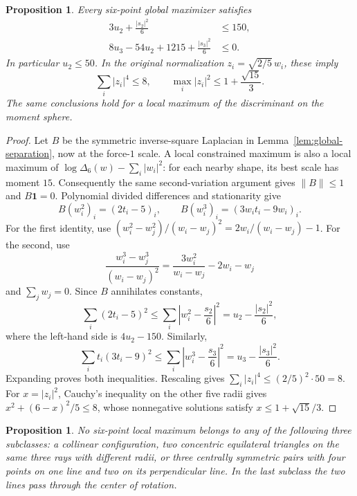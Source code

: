 \documentclass[11pt]{article}
\newtheorem{proposition}[theorem]{Proposition}
\theoremstyle{remark}
\numberwithin{equation}{section}
\begin{document}
\begin{proposition}\label{prop:six-radial-stability}
Every six-point global maximizer satisfies
\begin{align}
 3u_2+\frac{|s_2|^2}{6}&\le150,\label{eq:six-fourth-cut}\\
 8u_3-54u_2+1215+\frac{|s_3|^2}{6}&\le0.
 \label{eq:six-sixth-cut}
\end{align}
In particular $u_2\le50$.  In the original normalization
$z_i=\sqrt{2/5}\,w_i$, these imply
\[
 \sum_i|z_i|^4\le8,\qquad
 \max_i|z_i|^2\le1+\frac{\sqrt{15}}3.
\]
The same conclusions hold for a local maximum of the discriminant
on the moment sphere.
\end{proposition}

\begin{proof}
Let $B$ be the symmetric inverse-square Laplacian in
Lemma~\ref{lem:global-separation}, now at the force-$1$ scale.
A local constrained maximum is also a local maximum of
$\log\Delta_6(w)-\sum_i|w_i|^2$: for each nearby shape, its best
scale has moment $15$.  Consequently the same second-variation
argument gives $\|B\|\le1$ and $B\mathbf1=0$.
Polynomial divided differences and stationarity give
\[
 B(w_i^2)_i=(2t_i-5)_i,
 \qquad
 B(w_i^3)_i=(3w_it_i-9w_i)_i.
\]
For the first identity, use
$(w_i^2-w_j^2)/(w_i-w_j)^2=2w_i/(w_i-w_j)-1$.
For the second, use
\[
 \frac{w_i^3-w_j^3}{(w_i-w_j)^2}
 =\frac{3w_i^2}{w_i-w_j}-2w_i-w_j
\]
and $\sum_jw_j=0$.
Since $B$ annihilates constants,
\[
 \sum_i(2t_i-5)^2
 \le\sum_i\left|w_i^2-\frac{s_2}{6}\right|^2
 =u_2-\frac{|s_2|^2}{6},
\]
where the left-hand side is $4u_2-150$.
Similarly,
\[
 \sum_it_i(3t_i-9)^2
 \le\sum_i\left|w_i^3-\frac{s_3}{6}\right|^2
 =u_3-\frac{|s_3|^2}{6}.
\]
Expanding proves both inequalities.
Rescaling gives $\sum_i|z_i|^4\le(2/5)^2\cdot50=8$.
For $x=|z_i|^2$, Cauchy's inequality on the other five radii gives
$x^2+(6-x)^2/5\le8$, whose nonnegative solutions satisfy
$x\le1+\sqrt{15}/3$.
\end{proof}

\begin{proposition}\label{prop:six-excluded-subclasses}
No six-point local maximum belongs to any of the following three
subclasses: a collinear configuration, two concentric equilateral
triangles on the same three rays with different radii, or three
centrally symmetric pairs with four points on one line and two on
its perpendicular line.  In the last subclass the two lines pass
through the center of rotation.
\end{proposition}
\end{document}
